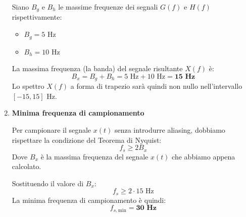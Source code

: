 \begin{soluzione}{18}
\begin{enumerate}
        Siano $B_g$ e $B_h$ le massime frequenze dei segnali $G(f)$ e $H(f)$ rispettivamente:
        \begin{itemize}
            \item $B_g = 5$ Hz
            \item $B_h = 10$ Hz
        \end{itemize}
        La massima frequenza (la banda) del segnale risultante $X(f)$ è:
        \[
            B_x = B_g + B_h = 5 \text{ Hz} + 10 \text{ Hz} = \mathbf{15 \text{ Hz}}
        \]
        Lo spettro $X(f)$ a forma di trapezio sarà quindi non nullo nell'intervallo $[-15, 15]$ Hz.
        
        \item \textbf{Minima frequenza di campionamento}
        
        Per campionare il segnale $x(t)$ senza introdurre aliasing, dobbiamo rispettare la condizione del Teorema di Nyquist:
        \[
            f_s \ge 2 B_x
        \]
        Dove $B_x$ è la massima frequenza del segnale $x(t)$ che abbiamo appena calcolato.
        
        Sostituendo il valore di $B_x$:
        \[
            f_s \ge 2 \cdot 15 \text{ Hz}
        \]
        La minima frequenza di campionamento è quindi:
        \[
            f_{s, \text{min}} = \mathbf{30 \text{ Hz}}
        \]
        
    \end{enumerate}
\end{soluzione}